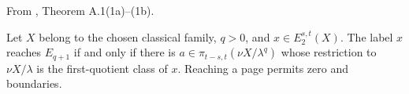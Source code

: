\begin{theorem}
\label{frontier:Literature:3aad75009ef0}
From \cite{BHS}, Theorem A.1(1a)--(1b).\par

Let $X$ belong to the chosen classical family, $q>0$, and $x\in E_2^{s,t}(X)$. The label $x$ reaches $E_{q+1}$ if and only if there is $a\in\pi_{t-s,t}(\nu X/\lambda^q)$ whose restriction to $\nu X/\lambda$ is the first-quotient class of $x$. Reaching a page permits zero and boundaries.
\end{theorem}

